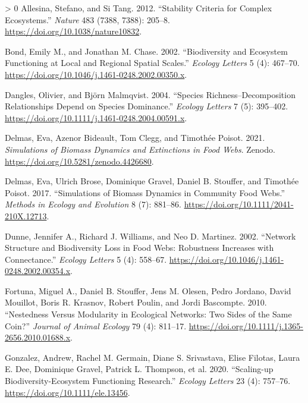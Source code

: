 \documentclass[11pt]{article}
\newlength{\cslhangindent}
\newenvironment{CSLReferences}[3] %
 {%
  \setlength{\parindent}{0pt}
  \ifodd #1 \everypar{\setlength{\hangindent}{\cslhangindent}}\ignorespaces\fi
  \ifnum #2 > 0
  \setlength{\parskip}{#2\baselineskip}
  \fi
 }%
 {}
\begin{document}
\hypertarget{refs}{}
\begin{CSLReferences}{1}{0}
\leavevmode\hypertarget{ref-Allesina2012StaCrib}{}%
Allesina, Stefano, and Si Tang. 2012. {``Stability Criteria for Complex
Ecosystems.''} \emph{Nature} 483 (7388, 7388): 205--8.
\url{https://doi.org/10.1038/nature10832}.

\leavevmode\hypertarget{ref-Bond2002BioEco}{}%
Bond, Emily M., and Jonathan M. Chase. 2002. {``Biodiversity and
Ecosystem Functioning at Local and Regional Spatial Scales.''}
\emph{Ecology Letters} 5 (4): 467--70.
\url{https://doi.org/10.1046/j.1461-0248.2002.00350.x}.

\leavevmode\hypertarget{ref-Dangles2004SpeRic}{}%
Dangles, Olivier, and Björn Malmqvist. 2004. {``Species
Richness--Decomposition Relationships Depend on Species Dominance.''}
\emph{Ecology Letters} 7 (5): 395--402.
\url{https://doi.org/10.1111/j.1461-0248.2004.00591.x}.

\leavevmode\hypertarget{ref-Delmas2021SimBio}{}%
Delmas, Eva, Azenor Bideault, Tom Clegg, and Timothée Poisot. 2021.
\emph{Simulations of Biomass Dynamics and Extinctions in Food Webs}.
Zenodo. \url{https://doi.org/10.5281/zenodo.4426680}.

\leavevmode\hypertarget{ref-Delmas2017SimBio}{}%
Delmas, Eva, Ulrich Brose, Dominique Gravel, Daniel B. Stouffer, and
Timothée Poisot. 2017. {``Simulations of Biomass Dynamics in Community
Food Webs.''} \emph{Methods in Ecology and Evolution} 8 (7): 881--86.
\url{https://doi.org/10.1111/2041-210X.12713}.

\leavevmode\hypertarget{ref-Dunne2002NetStr}{}%
Dunne, Jennifer A., Richard J. Williams, and Neo D. Martinez. 2002.
{``Network Structure and Biodiversity Loss in Food Webs: Robustness
Increases with Connectance.''} \emph{Ecology Letters} 5 (4): 558--67.
\url{https://doi.org/10.1046/j.1461-0248.2002.00354.x}.

\leavevmode\hypertarget{ref-Fortuna2010NesModa}{}%
Fortuna, Miguel A., Daniel B. Stouffer, Jens M. Olesen, Pedro Jordano,
David Mouillot, Boris R. Krasnov, Robert Poulin, and Jordi Bascompte.
2010. {``Nestedness Versus Modularity in Ecological Networks: Two Sides
of the Same Coin?''} \emph{Journal of Animal Ecology} 79 (4): 811--17.
\url{https://doi.org/10.1111/j.1365-2656.2010.01688.x}.

\leavevmode\hypertarget{ref-Gonzalez2020ScaBio}{}%
Gonzalez, Andrew, Rachel M. Germain, Diane S. Srivastava, Elise Filotas,
Laura E. Dee, Dominique Gravel, Patrick L. Thompson, et al. 2020.
{``Scaling-up Biodiversity-Ecosystem Functioning Research.''}
\emph{Ecology Letters} 23 (4): 757--76.
\url{https://doi.org/10.1111/ele.13456}.


\end{CSLReferences}
\end{document}

